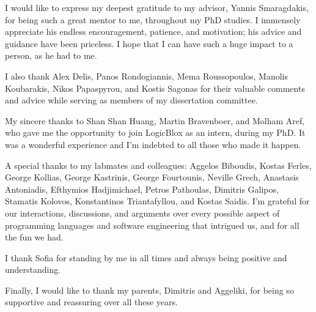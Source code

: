 I would like to express my deepest gratitude to my advisor, Yannis
Smaragdakis, for being such a great mentor to me, throughout my PhD
studies. I immensely appreciate his endless encouragement, patience,
and motivation; his advice and guidance have been priceless. I hope
that I can have such a huge impact to a person, as he had to me.

I also thank Alex Delis, Panos Rondogiannis, Mema Roussopoulos,
Manolis Koubarakis, Nikos Papaspyrou, and Kostis Sagonas for their
valuable comments and advice while serving as members of my
dissertation committee.

My sincere thanks to Shan Shan Huang, Martin Bravenboer, and Molham
Aref, who gave me the opportunity to join LogicBlox as an intern,
during my PhD. It was a wonderful experience and I'm indebted to all
those who made it happen.

A special thanks to my labmates and colleagues: Aggelos Biboudis,
Kostas Ferles, George Kollias, George Kastrinis, George Fourtounis,
Neville Grech, Anastasis Antoniadis, Efthymios Hadjimichael, Petros
Pathoulas, Dimitris Galipos, Stamatis Kolovos, Konstantinos
Triantafyllou, and Kostas Saidis.
%
I'm grateful for our interactions, discussions, and arguments over
every possible aspect of programming languages and software
engineering that intrigued us, and for all the fun we had.

I thank Sofia for standing by me in all times and always being
positive and understanding.

Finally, I would like to thank my parents, Dimitris and Aggeliki, for
being so supportive and reassuring over all these years.


